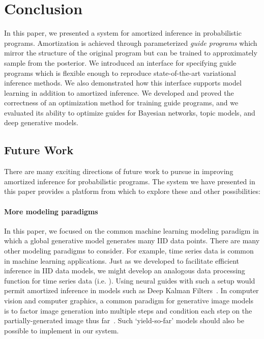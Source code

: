 \section{Conclusion}
\label{sec:conclusion}

In this paper, we presented a system for amortized inference in probabilistic programs.
Amortization is achieved through parameterized \emph{guide programs} which mirror the structure of the original program but can be trained to approximately sample from the posterior.
We introduced an interface for specifying guide programs which is flexible enough to reproduce state-of-the-art variational inference methods.
We also demonstrated how this interface supports model learning in addition to amortized inference.
We developed and proved the correctness of an optimization method for training guide programs, and we evaluated its ability to optimize guides for Bayesian networks, topic models, and deep generative models.

\subsection{Future Work}
\label{sec:conclusion_futureWork}

There are many exciting directions of future work to pursue in improving amortized inference for probabilistic programs. The system we have presented in this paper provides a platform from which to explore these and other possibilities:

\paragraph{More modeling paradigms}
In this paper, we focused on the common machine learning modeling paradigm in which a global generative model generates many IID data points.
There are many other modeling paradigms to consider.
For example, time series data is common in machine learning applications. Just as we developed  to facilitate efficient inference in IID data models, we might develop an analogous data processing function for time series data (i.e. ). Using neural guides with such a setup would permit amortized inference in models such as Deep Kalman Filters~\cite{DeepKalmanFilters}.
In computer vision and computer graphics, a common paradigm for generative image models is to factor image generation into multiple steps and condition each step on the partially-generated image thus far~\cite{PixelCNN,NGPM}.
Such `yield-so-far' models should also be possible to implement in our system.

